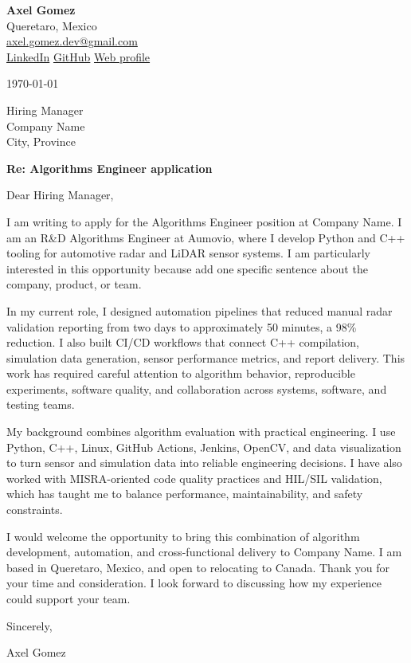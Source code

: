 \documentclass[letterpaper,11pt]{article}
\begin{document}
{\Large\textbf{Axel Gomez}}\\
Queretaro, Mexico\\
\href{mailto:axel.gomez.dev@gmail.com}{axel.gomez.dev@gmail.com}\\
\href{https://www.linkedin.com/in/axelgomez16}{LinkedIn} \quad
\href{https://github.com/AxelGomez16}{GitHub} \quad
\href{http://localhost:8000}{Web profile}

\vspace{18pt}
\today

\vspace{12pt}
Hiring Manager\\
Company Name\\
City, Province

\vspace{12pt}
\textbf{Re: Algorithms Engineer application}

Dear Hiring Manager,

I am writing to apply for the Algorithms Engineer position at Company Name. I am an R\&D Algorithms Engineer at Aumovio, where I develop Python and C++ tooling for automotive radar and LiDAR sensor systems. I am particularly interested in this opportunity because add one specific sentence about the company, product, or team.

In my current role, I designed automation pipelines that reduced manual radar validation reporting from two days to approximately 50 minutes, a 98\% reduction. I also built CI/CD workflows that connect C++ compilation, simulation data generation, sensor performance metrics, and report delivery. This work has required careful attention to algorithm behavior, reproducible experiments, software quality, and collaboration across systems, software, and testing teams.

My background combines algorithm evaluation with practical engineering. I use Python, C++, Linux, GitHub Actions, Jenkins, OpenCV, and data visualization to turn sensor and simulation data into reliable engineering decisions. I have also worked with MISRA-oriented code quality practices and HIL/SIL validation, which has taught me to balance performance, maintainability, and safety constraints.

I would welcome the opportunity to bring this combination of algorithm development, automation, and cross-functional delivery to Company Name. I am based in Queretaro, Mexico, and open to relocating to Canada. Thank you for your time and consideration. I look forward to discussing how my experience could support your team.

Sincerely,

\vspace{8pt}
Axel Gomez
\end{document}
